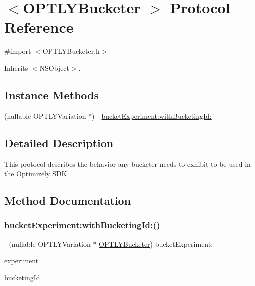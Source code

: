 \hypertarget{protocol_o_p_t_l_y_bucketer_01-p}{}\section{$<$O\+P\+T\+L\+Y\+Bucketer $>$ Protocol Reference}
\label{protocol_o_p_t_l_y_bucketer_01-p}


{\ttfamily \#import $<$O\+P\+T\+L\+Y\+Bucketer.\+h$>$}



Inherits $<$\+N\+S\+Object$>$.

\subsection*{Instance Methods}
\begin{DoxyCompactItemize}
\item 
(nullable O\+P\+T\+L\+Y\+Variation $\ast$) -\/ \mbox{\hyperlink{protocol_o_p_t_l_y_bucketer_01-p_a7316146d28fad734f09733b331560a36}{bucket\+Experiment\+:with\+Bucketing\+Id\+:}}
\end{DoxyCompactItemize}


\subsection{Detailed Description}
This protocol describes the behavior any bucketer needs to exhibit to be used in the \mbox{\hyperlink{interface_optimizely}{Optimizely}} S\+DK. 

\subsection{Method Documentation}
\mbox{\label{protocol_o_p_t_l_y_bucketer_01-p_a7316146d28fad734f09733b331560a36}} 
\subsubsection{\texorpdfstring{bucket\+Experiment\+:with\+Bucketing\+Id\+:()}{bucketExperiment:withBucketingId:()}}
{\footnotesize\ttfamily -\/ (nullable O\+P\+T\+L\+Y\+Variation $\ast$ \mbox{\hyperlink{interface_o_p_t_l_y_bucketer}{O\+P\+T\+L\+Y\+Bucketer}}) bucket\+Experiment\+: \begin{DoxyParamCaption}\item[{(nonnull O\+P\+T\+L\+Y\+Experiment $\ast$)}]{experiment }\item[{withBucketingId:(nonnull N\+S\+String $\ast$)}]{bucketing\+Id }\end{DoxyParamCaption}}

